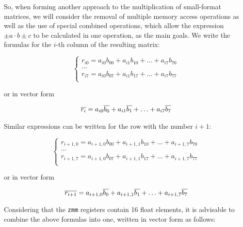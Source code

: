 \documentclass[
11pt,%
tightenlines,%
twoside,%
onecolumn,%
nofloats,%
nobibnotes,%
nofootinbib,%
superscriptaddress,%
noshowpacs,%
centertags]%
{revtex4}
\begin{document}
So, when forming another approach to the multiplication of small-format matrices, we will consider the removal of multiple memory access operations as well as the use of special combined operations, which allow the expression $\pm a \cdot b \pm c$ to be calculated in one operation, as the main goals.
We write the formulas for the $i$-th column of the resulting matrix:

\begin{equation}
\begin{cases}
r_{i0} = a_{i0}b_{00} + a_{i1}b_{10} + \ldots + a_{i7}b_{70} \\
\ldots \\
r_{i7} = a_{i0}b_{07} + a_{i1}b_{17} + \ldots + a_{i7}b_{77} \\
\end{cases}
\end{equation}

or in vector form

\begin{equation}
\overline{r_i} = a_{i0}\overline{b_0} + a_{i1}\overline{b_1} + \ldots + a_{i7}\overline{b_7} \\
\end{equation}

Similar expressions can be written for the row with the number $i + 1$:

\begin{equation}
\begin{cases}
r_{i+1,0} = a_{i+1,0}b_{00} + a_{i+1,1}b_{10} + \ldots + a_{i+1,7}b_{70} \\
\ldots \\
r_{i+1,7} = a_{i+1,0}b_{07} + a_{i+1,1}b_{17} + \ldots + a_{i+1,7}b_{77} \\
\end{cases}
\end{equation}

or in vector form

\begin{equation}
\overline{r_{i+1}} = a_{i+1,0}\overline{b_0} + a_{i+1,1}\overline{b_1} + \ldots + a_{i+1,7}\overline{b_7} \\
\end{equation}

Considering that the \texttt{zmm} registers contain 16 float elements, it is advisable to combine the above formulas into one, written in vector form as follows:
\end{document}

